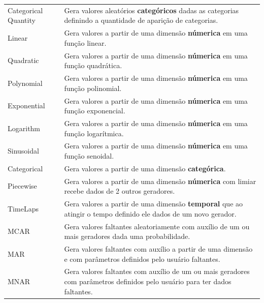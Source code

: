 \documentclass[
	12pt,				%
	openright,			%
	twoside,			%
	a4paper,			%
	english,			%
	brazil				%
	]{abntex2}
\begin{document}
\begin{table}[h]
\begin{tabular}{l|p{14cm}}
				Categorical Quantity & Gera valores aleatórios \textbf{categóricos} dadas as categorias definindo a quantidade de aparição de categorias. \\
				Linear               & Gera valores a partir de uma dimensão \textbf{númerica} em uma função linear.\\
				Quadratic            & Gera valores a partir de uma dimensão \textbf{númerica} em uma função quadrática.\\
				Polynomial           & Gera valores a partir de uma dimensão \textbf{númerica} em uma função polinomial.\\
				Exponential          & Gera valores a partir de uma dimensão \textbf{númerica} em uma função exponencial.\\
				Logarithm            & Gera valores a partir de uma dimensão \textbf{númerica} em uma função logarítmica.\\
				Sinusoidal           & Gera valores a partir de uma dimensão \textbf{númerica} em uma função senoidal.\\
				Categorical          & Gera valores a partir de uma dimensão \textbf{categórica}.\\
				Piecewise            & Gera valores a partir de uma dimensão \textbf{númerica} com limiar recebe dados de 2 outros geradores. \\
				TimeLaps             & Gera valores a partir de uma dimensão \textbf{temporal} que ao atingir o tempo definido ele dados de um novo gerador.  \\
				MCAR                 & Gera valores faltantes aleatoriamente com auxílio de um ou mais geradores dada uma probabilidade. \\
				MAR                  & Gera valores faltantes com auxílio a partir de uma dimensão e com parâmetros definidos pelo usuário faltantes. \\
				MNAR                 & Gera valores faltantes com auxílio de um ou mais geradores com parâmetros definidos pelo usuário para ter dados faltantes. \\

\end{tabular}
\end{table}
\end{document}
